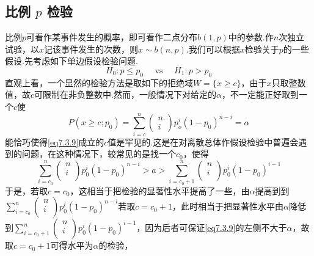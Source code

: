 \subsection{比例 $p$ 检验\label{sec:7.3.2}}
比例$p$可看作某事件发生的概率，即可看作二点分布$b(1,p)$中的参数.作$n$次独立试验，以$x$记该事件发生的次数，则$x\sim b(n,p)$.我们可以根据$x$检验关于$p$的一些假设.先考虑如下单边假设检验问题.
\begin{equation}\label{eq7.3.8}
H _ { 0 } : p \leq p _ { 0 } \quad \text { vs } \quad H _ { 1 } : p > p _ { 0 }
\end{equation}
直观上看，一个显然的检验方法是取如下的拒绝域$W=\{x\geq c\}$，由于$x$只取整数值，故$c$可限制在非负整数中.然而，一般情况下对给定的$\alpha$，不一定能正好取到一个$c$使
	\begin{equation}\label{eq7.3.9}
	P \left( x \geq c ; p _ { 0 } \right) = \sum _ { i = c } ^ { n } \left( \begin{array} { l } { n } \\ { i } \end{array} \right) p _ { o } ^ { i } \left( 1 - p _ { 0 } \right) ^ { n - i } = \alpha
	\end{equation}
能恰巧使得\ref{eq7.3.9}成立的$c$值是罕见的.这是在对离散总体作假设检验中普遍会遇到的问题，在这种情况下，较常见的是找一个$c_{0}$，使得
\[\sum_{i=c_0}^n{\left(\begin{array}{l}
	n\\
	i\\
	\end{array}\right)}p_{0}^{i}\left(1-p_0\right)^{n-i}>a>\sum_{i=c_0+1}^n{\left(\begin{array}{c}
	n\\
	i\\
	\end{array}\right)}p_{0}^{i}\left(1-p_0\right)^{i-1}\]
于是，若取$c=c_{0}$，这相当于把检验的显著性水平提高了一些，由$\alpha$提高到到$\sum_{i=c_0}^n{\left(\begin{array}{l}
	n\\
	i\\
	\end{array}\right)}p_{0}^{i}\left(1-p_0\right)^{n-i}$若取$c=c_{0}+1$，此时相当于把显著性水平由$\alpha$降低到$\sum_{i=c_0+1}^n{\left(\begin{array}{c}
	n\\
	i\\
	\end{array}\right)}p_{0}^{i}\left(1-p_0\right)^{i-1}$，因为后者可保证\ref{eq7.3.9}的左侧不大于$\alpha$，故取$c=c_{0}+1$可得水平为$\alpha$的检验，


